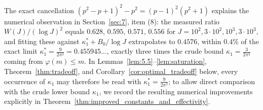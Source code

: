 \documentclass[11pt, a4paper]{article}
\theoremstyle{plain}
\theoremstyle{definition}
\begin{document}
The exact cancellation $(p^{2}-p+1)^{2}-p^{2}=(p-1)^{2}(p^{2}+1)$ explains the numerical observation in Section~\ref{sec:7}, item (8): the measured ratio $W(J)/(\log J)^{2}$ equals $0.628$, $0.595$, $0.571$, $0.556$ for $J=10^{2},3\cdot10^{2},10^{3},3\cdot10^{3}$, and fitting these against $\kappa_1^{\ast}+B_0/\log J$ extrapolates to $0.4576$, within $0.4\%$ of the exact limit $\kappa_1^{\ast}=\frac{9}{2\pi^{2}}=0.455945\ldots$, exactly three times the crude bound $\kappa_1=\frac{3}{2\pi^{2}}$ coming from $\varphi(m)\le m$. In Lemmas~\ref{lem:5.5}--\ref{lem:saturation}, Theorem~\ref{thm:tradeoff}, and Corollary~\ref{cor:optimal_tradeoff} below, every occurrence of $\kappa_1$ may therefore be read with $\kappa_1^{\ast}=\frac{9}{2\pi^{2}}$; to allow direct comparison with the crude lower bound $\kappa_1$, we record the resulting numerical improvements explicitly in Theorem~\ref{thm:improved_constants_and_effectivity}.
\end{document}
